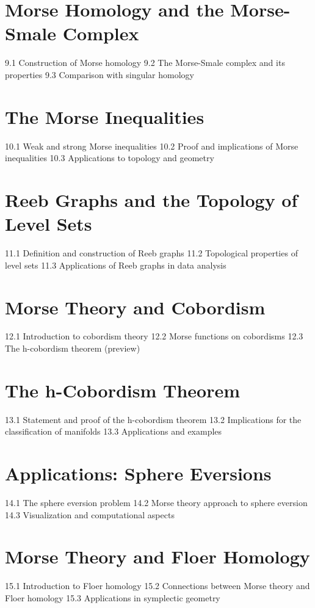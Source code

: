 \section{Morse Homology and the Morse-Smale Complex}
9.1 Construction of Morse homology
9.2 The Morse-Smale complex and its properties
9.3 Comparison with singular homology
\section{The Morse Inequalities}
10.1 Weak and strong Morse inequalities
10.2 Proof and implications of Morse inequalities
10.3 Applications to topology and geometry
\section{Reeb Graphs and the Topology of Level Sets}
11.1 Definition and construction of Reeb graphs
11.2 Topological properties of level sets
11.3 Applications of Reeb graphs in data analysis
\section{Morse Theory and Cobordism}
12.1 Introduction to cobordism theory
12.2 Morse functions on cobordisms
12.3 The h-cobordism theorem (preview)
\section{The h-Cobordism Theorem}
13.1 Statement and proof of the h-cobordism theorem
13.2 Implications for the classification of manifolds
13.3 Applications and examples
\section{Applications: Sphere Eversions}
14.1 The sphere eversion problem
14.2 Morse theory approach to sphere eversion
14.3 Visualization and computational aspects
\section{Morse Theory and Floer Homology}
15.1 Introduction to Floer homology
15.2 Connections between Morse theory and Floer homology
15.3 Applications in symplectic geometry
